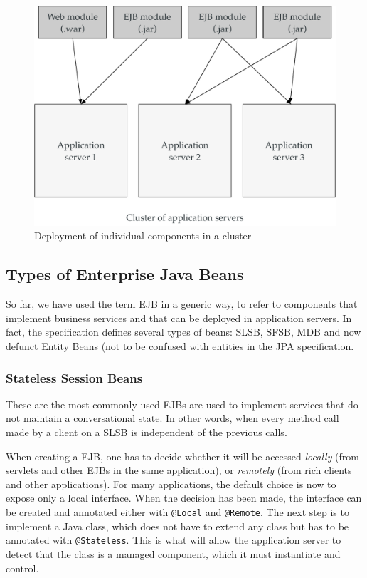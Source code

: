 \begin{figure}[]
	\centering
    \includegraphics[width=0.8\linewidth]{Figures/deployment-ejb.pdf}
	\caption{Deployment of individual components in a cluster}
  \label{fig:deploymentEjb}
\end{figure}



\subsection{Types of Enterprise Java Beans}


So far, we have used the term \ac{EJB} in a generic way, to refer to components that implement business services and that can be deployed in application servers. In fact, the specification defines several types of beans: \ac{SLSB}, \ac{SFSB}, \ac{MDB} and now defunct Entity Beans (not to be confused with entities in the \ac{JPA} specification.

\subsubsection{Stateless Session Beans}

These are the most commonly used \ac{EJB}s are used to implement services that do not maintain a conversational state. In other words, when every method call made by a client on a \ac{SLSB} is independent of the previous calls.

When creating a \ac{EJB}, one has to decide whether it will be accessed \emph{locally} (from servlets and other \ac{EJB}s in the same application), or \emph{remotely} (from rich clients and other applications). For many applications, the default choice is now to expose only a local interface. When the decision has been made, the interface can be created and annotated either with \texttt{@Local} and \texttt{@Remote}. The next step is to implement a Java class, which does not have to extend any class but has to be annotated with \texttt{@Stateless}. This is what will allow the application server to detect that the class is a managed component, which it must instantiate and control.

